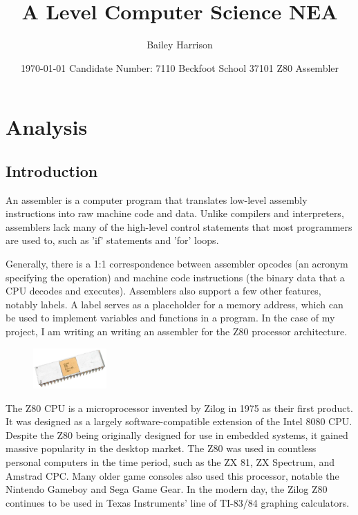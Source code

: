 \documentclass[a4paper]{report}
\title{A Level Computer Science NEA}
\author{Bailey Harrison}
\date{
	\today\endgraf\bigskip
	Candidate Number: 7110\endgraf\bigskip
	Beckfoot School 37101\endgraf\bigskip
	Z80 Assembler
}
\begin{document}
\maketitle

\tableofcontents



\chapter{Analysis}

\section{Introduction}

An assembler is a computer program that translates low-level assembly
instructions into raw machine code and data. Unlike compilers and interpreters,
assemblers lack many of the high-level control statements that most programmers
are used to, such as 'if' statements and 'for' loops.

Generally, there is a 1:1 correspondence between assembler opcodes (an acronym
specifying the operation) and machine code instructions (the binary data that a
CPU decodes and executes). Assemblers also support a few other features, notably
labels. A label serves as a placeholder for a memory address, which can be used
to implement variables and functions in a program. In the case of my project, I
am writing an writing an assembler for the Z80 processor architecture.

\bigskip

\begin{figure}
    \centering
    \includegraphics[width=0.25\textwidth]{z80}
\end{figure}

The Z80 CPU is a microprocessor invented by Zilog in 1975 as their first
product. It was designed as a largely software-compatible extension of the Intel
8080 CPU. Despite the Z80 being originally designed for use in embedded systems,
it gained massive popularity in the desktop market. The Z80 was used in
countless personal computers in the time period, such as the ZX 81, ZX Spectrum,
and Amstrad CPC. Many older game consoles also used this processor, notable the
Nintendo Gameboy and Sega Game Gear. In the modern day, the Zilog Z80 continues
to be used in Texas Instruments' line of TI-83/84 graphing calculators.
\end{document}
